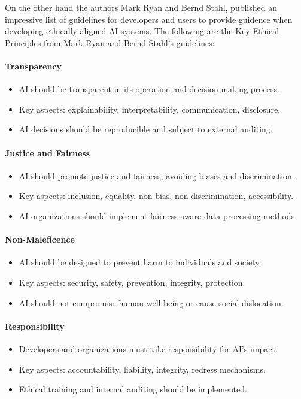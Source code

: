 On the other hand the authors Mark Ryan and Bernd Stahl, published an impressive list of guidelines for developers and users\cite{ryan2020artificial} to provide guidence  when developing ethically aligned AI systems.
The following are the Key Ethical Principles from Mark Ryan and Bernd Stahl's guidelines:

\paragraph{Transparency}
\begin{itemize}
    \item AI should be transparent in its operation and decision-making process.
    \item Key aspects: explainability, interpretability, communication, disclosure.
    \item AI decisions should be reproducible and subject to external auditing.
\end{itemize}

\paragraph{Justice and Fairness}
\begin{itemize}
    \item AI should promote justice and fairness, avoiding biases and discrimination.
    \item Key aspects: inclusion, equality, non-bias, non-discrimination, accessibility.
    \item AI organizations should implement fairness-aware data processing methods.
\end{itemize}

\paragraph{Non-Maleficence}
\begin{itemize}
    \item AI should be designed to prevent harm to individuals and society.
    \item Key aspects: security, safety, prevention, integrity, protection.
    \item AI should not compromise human well-being or cause social dislocation.
\end{itemize}

\paragraph{Responsibility}
\begin{itemize}
    \item Developers and organizations must take responsibility for AI’s impact.
    \item Key aspects: accountability, liability, integrity, redress mechanisms.
    \item Ethical training and internal auditing should be implemented.
\end{itemize}


